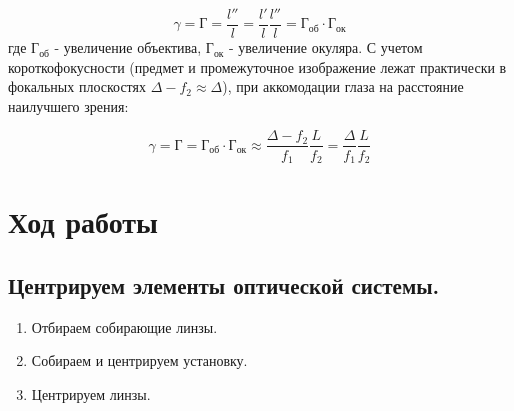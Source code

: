 \documentclass[12pt,a4paper]{article}
\begin{document}
\begin{equation}
    \gamma = Г = \frac{l''}{l} = \frac{l'}{l} \frac{l''}{l} = Г_{об} \cdot Г_{ок} \label{eq:Gamma_2}
\end{equation}
где $Г_{об}$ - увеличение объектива, $Г_{ок}$ - увеличение окуляра. С учетом короткофокусности (предмет и промежуточное изображение лежат практически в фокальных плоскостях $\Delta - f_2 \approx \Delta$), при
аккомодации глаза на расстояние наилучшего зрения:

\begin{equation}
    \gamma = Г = Г_{об} \cdot Г_{ок} \approx \frac{\Delta - f_2}{f_1} \frac{L}{f_2} = \frac{\Delta}{f_1} \frac{L}{f_2} \label{eq:Gamma_2}
\end{equation}

\section{Ход работы}

\subsection{Центрируем элементы оптической системы.}
\begin{enumerate}
    \item Отбираем собирающие линзы.
    \item Собираем и центрируем установку.
    \item Центрируем линзы.
\end{enumerate}
\end{document}
